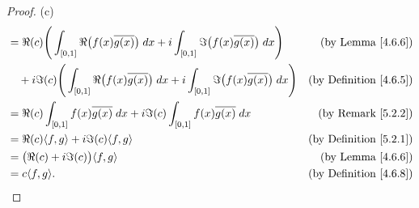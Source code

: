 \begin{proof}{(c)}
\begin{align*}
         & = \Re(c) \Bigg(\int_{[0, 1]} \Re\big(f(x) \overline{g(x)}\big) \; dx + i \int_{[0, 1]} \Im\big(f(x) \overline{g(x)}\big) \; dx\Bigg)         & \text{(by Lemma \ref{4.6.6})}        \\
         & \quad + i \Im(c) \Bigg(\int_{[0, 1]} \Re\big(f(x) \overline{g(x)}\big) \; dx + i \int_{[0, 1]} \Im\big(f(x) \overline{g(x)}\big) \; dx\Bigg) & \text{(by Definition \ref{4.6.5})}   \\
         & = \Re(c) \int_{[0, 1]} f(x) \overline{g(x)} \; dx + i \Im(c) \int_{[0, 1]} f(x) \overline{g(x)} \; dx                                        & \text{(by Remark \ref{5.2.2})}       \\
         & = \Re(c) \inner*{f, g} + i \Im(c) \inner*{f, g}                                                                                              & \text{(by Definition \ref{5.2.1})}   \\
         & = \big(\Re(c) + i \Im(c)\big) \inner*{f, g}                                                                                                  & \text{(by Lemma \ref{4.6.6})}        \\
         & = c \inner*{f, g}.                                                                                                                           & \text{(by Definition \ref{4.6.8})}
    \end{align*}
\end{proof}

